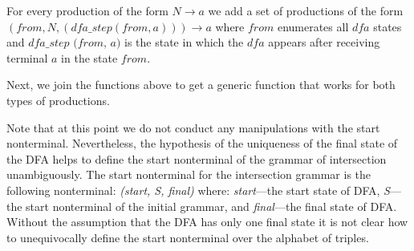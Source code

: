 For every production of the form $N \to a$ we add a set of productions of the form $(\textit{from}, N, (\textit{dfa\_step}(\textit{from}, a))) \to a$ where $\textit{from}$ enumerates all $\textit{dfa}$ states and $\textit{dfa\_step (from, a)}$ is the state in which the $\textit{dfa}$ appears after receiving terminal $a$ in the state $\textit{from}$.


Next, we join the functions above to get a generic function that works for both types of productions.




Note that at this point we do not conduct any manipulations with the start nonterminal. Nevertheless, the hypothesis of the uniqueness of the final state of the DFA helps to define the start nonterminal of the grammar of intersection unambiguously. The start nonterminal for the intersection grammar is the following nonterminal: \textit{(start, S, final)} where: \textit{start}---the start state of DFA, \textit{S}---the start nonterminal of the initial grammar, and \textit{final}---the final state of DFA. Without the assumption that the DFA has only one final state it is not clear how to unequivocally define the start nonterminal over the alphabet of triples.

